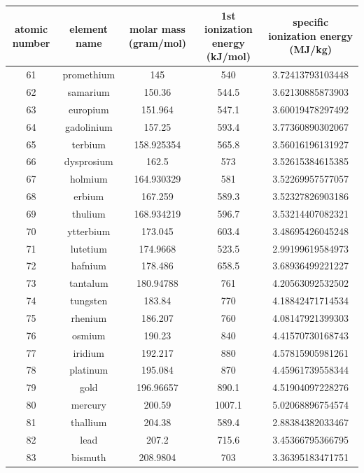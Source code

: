 \documentclass[a4paper]{article}
\begin{document}
	\begin{center}
	\begin{tabular}{|c|c|c|c|c|}
		\hline
		atomic number & element name & molar mass (gram/mol) & 1st ionization energy (kJ/mol) & specific ionization energy (MJ/kg) \\
		\hline
		61 & promethium & 145 & 540 & 3.72413793103448 \\
		\hline
		62 & samarium & 150.36 & 544.5 & 3.62130885873903 \\
		\hline
		63 & europium & 151.964 & 547.1 & 3.60019478297492 \\
		\hline
		64 & gadolinium & 157.25 & 593.4 & 3.77360890302067 \\
		\hline
		65 & terbium & 158.925354 & 565.8 & 3.56016196131927 \\
		\hline
		66 & dysprosium & 162.5 & 573 & 3.52615384615385 \\
		\hline
		67 & holmium & 164.930329 & 581 & 3.52269957577057 \\
		\hline
		68 & erbium & 167.259 & 589.3 & 3.52327826903186 \\
		\hline
		69 & thulium & 168.934219 & 596.7 & 3.53214407082321 \\
		\hline
		70 & ytterbium & 173.045 & 603.4 & 3.48695426045248 \\
		\hline
		71 & lutetium & 174.9668 & 523.5 & 2.99199619584973 \\
		\hline
		72 & hafnium & 178.486 & 658.5 & 3.68936499221227 \\
		\hline
		73 & tantalum & 180.94788 & 761 & 4.20563092532502 \\
		\hline
		74 & tungsten & 183.84 & 770 & 4.18842471714534 \\
		\hline
		75 & rhenium & 186.207 & 760 & 4.08147921399303 \\
		\hline
		76 & osmium & 190.23 & 840 & 4.41570730168743 \\
		\hline
		77 & iridium & 192.217 & 880 & 4.57815905981261 \\
		\hline
		78 & platinum & 195.084 & 870 & 4.45961739558344 \\
		\hline
		79 & gold & 196.96657 & 890.1 & 4.51904097228276 \\
		\hline
		80 & mercury & 200.59 & 1007.1 & 5.02068896754574 \\
		\hline
		81 & thallium & 204.38 & 589.4 & 2.88384382033467 \\
		\hline
		82 & lead & 207.2 & 715.6 & 3.45366795366795 \\
		\hline
		83 & bismuth & 208.9804 & 703 & 3.36395183471751 \\

\end{tabular}
\end{center}
\end{document}
